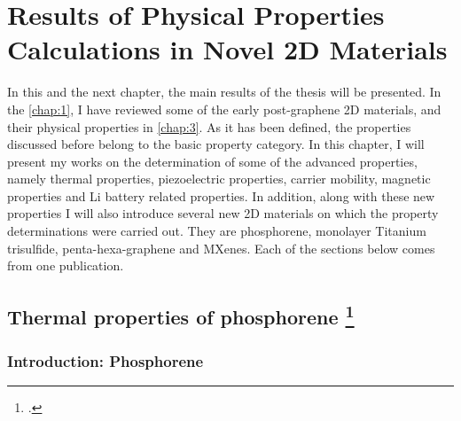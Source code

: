 
\chapter{Results of Physical Properties Calculations in Novel 2D Materials \label{chap:4}}

\ifpdf
    \graphicspath{{Chapter4/Figs/Raster/}{Chapter4/Figs/PDF/}{Chapter4/Figs/Vector/}}
\else
    \graphicspath{{Chapter4/Figs/Vector/}{Chapter4/Figs/}}
\fi


\nocite{Yimamu2012}


In this and the next chapter, the main results of the thesis will be presented. In the \autoref{chap:1}, I have reviewed some of the early post-graphene 2D materials, and their physical properties in \autoref{chap:3}. As it has been defined, the properties discussed before belong to the basic property category. In this chapter, I will present my works on the determination of some of the advanced properties, namely thermal properties, piezoelectric properties, carrier mobility, magnetic properties and Li battery related properties. In addition, along with these new properties I will also introduce several new 2D materials on which the property determinations were carried out. They are phosphorene, monolayer Titanium trisulfide, penta-hexa-graphene and MXenes. Each of the sections below comes from one publication. 

\section[Thermal properties of phosphorene]{Thermal properties of phosphorene \footcite[This work is published in:][]{Aierken2015.thermalP} }


\subsection{Introduction: Phosphorene}

